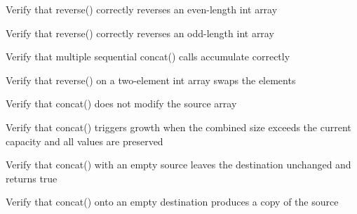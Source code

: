 \begin{DoxyRefList}
%
Verify that reverse() correctly reverses an even-\/length int array  
\item[Global \doxylink{test__array_8cpp_a057ede26b7c854c8f01876a81f4d2342}{TEST\+\_\+F} (\doxylink{classArrayInitTest}{Array\+Init\+Test}, Reverse\+Int\+Odd\+Length)]\label{test__test000124}%
%
Verify that reverse() correctly reverses an odd-\/length int array  
\item[Global \doxylink{test__array_8cpp_a979f1144ba03c6f7be4534cf292175a8}{TEST\+\_\+F} (\doxylink{classArrayInitTest}{Array\+Init\+Test}, Concat\+Multiple\+Sequential\+Calls)]\label{test__test000123}%
%
Verify that multiple sequential concat() calls accumulate correctly  
\item[Global \doxylink{test__array_8cpp_ab0ceb142f2a6d11024060e38d3fb3650}{TEST\+\_\+F} (\doxylink{classArrayInitTest}{Array\+Init\+Test}, Reverse\+Two\+Element\+Array)]\label{test__test000132}%
%
Verify that reverse() on a two-\/element int array swaps the elements  
\item[Global \doxylink{test__array_8cpp_a01c124e17157b38296eaed2c956ffdcd}{TEST\+\_\+F} (\doxylink{classArrayInitTest}{Array\+Init\+Test}, Concat\+Does\+Not\+Modify\+Source)]\label{test__test000121}%
%
Verify that concat() does not modify the source array  
\item[Global \doxylink{test__array_8cpp_a643dfcf2fd1d86a298e275b1a6a8b414}{TEST\+\_\+F} (\doxylink{classArrayInitTest}{Array\+Init\+Test}, Concat\+Triggers\+Growth)]\label{test__test000120}%
%
Verify that concat() triggers growth when the combined size exceeds the current capacity and all values are preserved  
\item[Global \doxylink{test__array_8cpp_ae5d55c107f2c9d218b055c82e7939c04}{TEST\+\_\+F} (\doxylink{classArrayInitTest}{Array\+Init\+Test}, Concat\+Empty\+Source\+Returns\+True)]\label{test__test000119}%
%
Verify that concat() with an empty source leaves the destination unchanged and returns true  
\item[Global \doxylink{test__array_8cpp_ac3624910d2021da9ea865c02f94e93e0}{TEST\+\_\+F} (\doxylink{classArrayInitTest}{Array\+Init\+Test}, Concat\+Onto\+Empty\+Array)]\label{test__test000118}%
%
Verify that concat() onto an empty destination produces a copy of the source  
\item[Global \doxylink{test__array_8cpp_a4cffa142fcf72582bf3c2de4c8c705f1}{TEST\+\_\+F} (\doxylink{classArrayInitTest}{Array\+Init\+Test}, Concat\+Point\+Appends\+Correctly)]\label{test__test000117}%

\end{DoxyRefList}
